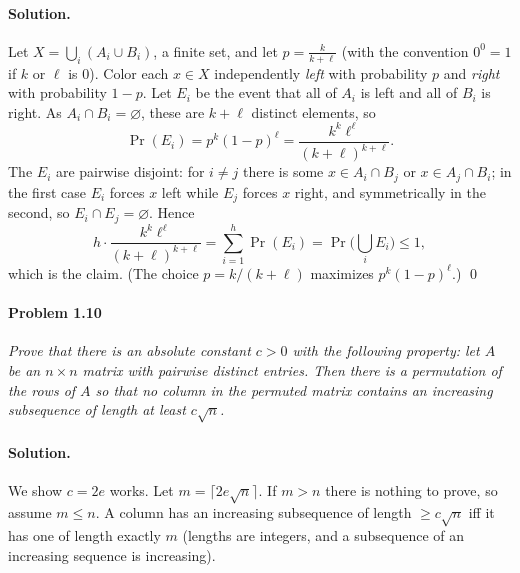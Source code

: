 \documentclass[a4paper,12pt]{article}
\theoremstyle{definition}
\theoremstyle{plain}
\begin{document}
\paragraph{Solution.} Let $X = \bigcup_i (A_i \cup B_i)$, a finite set, and let $p = \frac{k}{k+\ell}$ (with the convention $0^0 = 1$ if $k$ or $\ell$ is $0$). Color each $x \in X$ independently \emph{left} with probability $p$ and \emph{right} with probability $1 - p$. Let $E_i$ be the event that all of $A_i$ is left and all of $B_i$ is right. As $A_i \cap B_i = \varnothing$, these are $k + \ell$ distinct elements, so
\[
	\Pr(E_i) = p^k (1-p)^\ell = \frac{k^k \ell^\ell}{(k+\ell)^{k+\ell}} .
\]
The $E_i$ are pairwise disjoint: for $i \ne j$ there is some $x \in A_i \cap B_j$ or $x \in A_j \cap B_i$; in the first case $E_i$ forces $x$ left while $E_j$ forces $x$ right, and symmetrically in the second, so $E_i \cap E_j = \varnothing$. Hence
\[
	h \cdot \frac{k^k \ell^\ell}{(k+\ell)^{k+\ell}} = \sum_{i=1}^h \Pr(E_i) = \Pr\Big( \bigcup_i E_i \Big) \le 1,
\]
which is the claim. (The choice $p = k/(k+\ell)$ maximizes $p^k(1-p)^\ell$.) \qed

\paragraph{Problem 1.10} \emph{Prove that there is an absolute constant $c > 0$ with the following property: let $A$ be an $n \times n$ matrix with pairwise distinct entries. Then there is a permutation of the rows of $A$ so that no column in the permuted matrix contains an increasing subsequence of length at least $c\sqrt n$.}

\paragraph{Solution.} We show $c = 2e$ works. Let $m = \lceil 2e\sqrt n \rceil$. If $m > n$ there is nothing to prove, so assume $m \le n$. A column has an increasing subsequence of length $\ge c\sqrt n$ iff it has one of length exactly $m$ (lengths are integers, and a subsequence of an increasing sequence is increasing).
\end{document}
